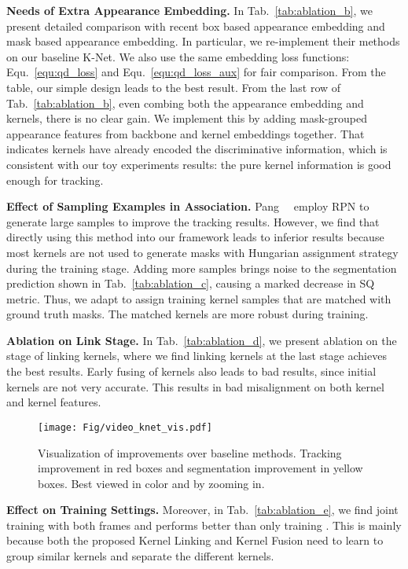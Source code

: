 \noindent
\textbf{Needs of Extra Appearance Embedding.} In Tab.~\ref{tab:ablation_b}, we present detailed comparison with recent box based appearance embedding and mask based appearance embedding. In particular, we re-implement their methods on our baseline K-Net. We also use the same embedding loss functions: Equ.~\ref{equ:qd_loss} and Equ.~\ref{equ:qd_loss_aux} for fair comparison. From the table, our simple design leads to the best result. From the last row of Tab.~\ref{tab:ablation_b}, even combing both the appearance embedding and kernels, there is no clear gain. We implement this by adding mask-grouped appearance features from backbone and kernel embeddings together. That indicates kernels have already encoded the discriminative information, which is consistent with our toy experiments results: the pure kernel information is good enough for tracking. 

\noindent
\textbf{Effect of Sampling Examples in Association.} Pang~\etal~\cite{qdtrack} employ RPN to generate large samples to improve the tracking results. However, we find that directly using this method into our framework leads to inferior results because most kernels are not used to generate masks with Hungarian assignment strategy during the training stage. Adding more samples brings noise to the segmentation prediction shown in Tab.~\ref{tab:ablation_c}, causing a marked decrease in SQ metric. Thus, we adapt to assign training kernel samples that are matched with ground truth masks. The matched kernels are more robust during training.

\noindent
\textbf{Ablation on Link Stage.} In Tab.~\ref{tab:ablation_d}, we present ablation on the stage of linking kernels, where we find linking kernels at the last stage achieves the best results. Early fusing of kernels also leads to bad results, since initial kernels are not very accurate. This results in bad misalignment on both kernel and kernel features.


\begin{figure}[!t]
	\centering
	\texttt{[image: Fig/video\_knet\_vis.pdf]}
	\caption{\small Visualization of improvements over baseline methods. Tracking improvement in red boxes and segmentation improvement in yellow boxes. Best viewed in color and by zooming in. }
	\label{fig:vis_baseline}
\end{figure}

\vspace{1mm}
\noindent
\textbf{Effect on Training Settings.} Moreover, in Tab.~\ref{tab:ablation_e}, we find joint training with both frames  and  performs better than only training . This is mainly because both the proposed Kernel Linking and Kernel Fusion need to learn to group similar kernels and separate the different kernels.

